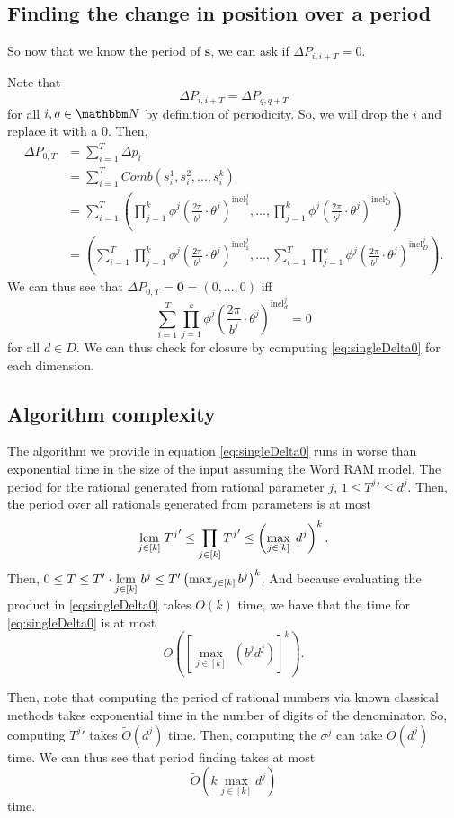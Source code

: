\documentclass[11pt,titlepage]{article}
\newcommand{\rationalPeriod}{{T^j}'}
\newcommand{\rationalPeriodTotal}{{T}'}
\newcommand{\totalPeriod}{T}
\newcommand{\totalStateNotime}{\pmb{s}}
\newcommand{\combWithState}[1]{Comb\left(s^1_{#1}, s^2_{#1}, ..., s^k_{#1}\right)}
\newcommand{\inclIndic}[2]{{\mathrm{incl}_{#1}^{#2}}}
\newcommand{\numbToAngle}{\frac{2\pi}{b^j}}
\newcommand{\digSumPeriodic}{\sigma^j}
\newcommand{\sinOrCos}{\phi^j}
\newcommand{\combSingleTerm}[1]{\prod_{j=1}^k \sinOrCos\left(\numbToAngle \cdot \theta^j\right) ^ {\inclIndic{#1}{j}}}
\begin{document}
\subsection{Finding the change in position over a period}
So now that we know the period of $\totalStateNotime$, we can ask if
$\Delta P_{i, i + T} = 0$.

Note that 
$$
\Delta P_{i, i + T} = \Delta P_{q, q + T}
$$
for all $i, q \in \N$ by definition of periodicity.
So, we will drop the $i$ and replace it with a $0$.
Then,
\begin{align*}
  \Delta P_{0, T} &= \sum_{i = 1}^T \Delta p_i \\
  &= \sum_{i = 1}^T \combWithState{i} \\
  &= \sum_{i = 1}^T \left(\combSingleTerm{1}, ..., \combSingleTerm{D}\right) \\
  &= \left(\sum_{i = 1}^T \combSingleTerm{1}, ..., \sum_{i = 1}^T \combSingleTerm{D}\right).
\end{align*}
We can thus see that $\Delta P_{0, T} = \pmb{0} = (0, ..., 0)$ iff 
\begin{equation}
\label{eq:singleDelta0}
\sum_{i = 1}^T \combSingleTerm{d} = 0
\end{equation}
for all $d \in D$.
We can thus check for closure by computing \eqref{eq:singleDelta0} for each dimension.

\subsection{Algorithm complexity}
The algorithm we provide in equation \eqref{eq:singleDelta0} runs in worse than exponential time
in the size of the input assuming the Word RAM model. 
The period for the rational generated from rational parameter $j$, $1 \leq \rationalPeriod \leq d^j$. Then,
the period over all rationals generated from parameters is at most 
$$
  \lcm{j \in [k]} \rationalPeriod \leq \prod_{j \in [k]} \rationalPeriod \leq \left(\max_{j \in [k]} \; d^j \right)^k.
$$
Then, 
$0 \leq \totalPeriod \leq \rationalPeriodTotal \cdot \lcm{j \in [k]} b^j \leq \rationalPeriodTotal \left(\max_{j \in [k]} b^j\right)^k$.
And because evaluating the product in \eqref{eq:singleDelta0} takes $O(k)$ time,
we have that the time for \eqref{eq:singleDelta0} is at most
$$
  O\left(\left[\max_{j \in [k]} \; (b^j d^j)\right]^k \right).
$$

Then, note that computing the period of rational numbers via known classical methods takes 
exponential time in the number of digits of the denominator. So, computing
$\rationalPeriod$ takes $\widetilde{O}(d^j)$ time. Then, computing the $\digSumPeriodic$
can take $O(d^j)$ time. 
We can thus see that period finding takes at most
$$
\widetilde{O}\left(k \max_{j \in [k]} d^j \right)
$$
time.
\end{document}
